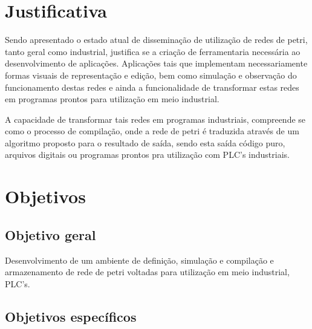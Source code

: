 \section{Justificativa}

Sendo apresentado o estado atual de disseminação de utilização de redes de petri, tanto geral como industrial, justifica se a criação de ferramentaria necessária ao desenvolvimento de aplicações. Aplicações tais que implementam necessariamente formas visuais de representação e edição, bem como simulação e observação do funcionamento destas redes e ainda a funcionalidade de transformar estas redes em programas prontos para utilização em meio industrial.

A capacidade de transformar tais redes em programas industriais, compreende se como o processo de compilação, onde a rede de petri é traduzida através de um algoritmo proposto para o resultado de saída, sendo esta saída código puro, arquivos digitais ou programas prontos pra utilização com PLC's industriais.

\section{Objetivos}

\subsection{Objetivo geral}

Desenvolvimento de um ambiente de definição, simulação e compilação e armazenamento de rede de petri voltadas para utilização em meio industrial, PLC's.

\subsection{Objetivos específicos}

